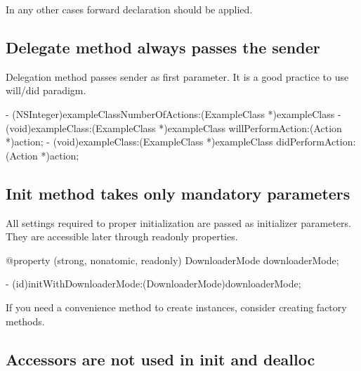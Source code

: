 \documentclass[10pt]{extarticle}
\newenvironment{codelisting}
{\footnotesize\mdframed[middlelinewidth=0.5pt, middlelinecolor=BaliHaiColor, skipabove=15pt]\verbatim}
{\endverbatim\endmdframed\vspace{12pt}\normalsize}
\newenvironment{tiplisting}
{\small\mdframed[middlelinewidth=0.5pt, middlelinecolor=GoldenDreamColor, skipabove=15pt]{\textbf{Tip:}}}
{\endmdframed\vspace{12pt}\normalsize}
\begin{document}
In any other cases forward declaration should be applied.


\subsection{Delegate method always passes the sender}

Delegation method passes sender as first parameter. It is a good practice to use will/did paradigm.

\begin{codelisting}
- (NSInteger)exampleClassNumberOfActions:(ExampleClass *)exampleClass
- (void)exampleClass:(ExampleClass *)exampleClass willPerformAction:(Action *)action;
- (void)exampleClass:(ExampleClass *)exampleClass didPerformAction:(Action *)action;
\end{codelisting}


%
%


\subsection{Init method takes only mandatory parameters}

All settings required to proper initialization are passed as initializer parameters. They are accessible later through readonly properties.

\begin{codelisting}
@property (strong, nonatomic, readonly) DownloaderMode downloaderMode;

- (id)initWithDownloaderMode:(DownloaderMode)downloaderMode;
\end{codelisting}

\begin{tiplisting}
If you need a convenience method to create instances, consider creating factory methods.
\end{tiplisting}


\subsection{Accessors are not used in init and dealloc}
\end{document}
